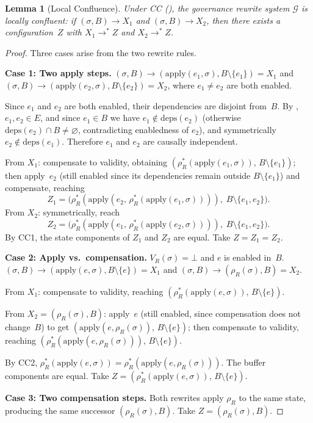 \documentclass[11pt,a4paper]{article}
\theoremstyle{plain}
\newtheorem{lemma}[theorem]{Lemma}
\theoremstyle{definition}
\theoremstyle{remark}
\renewcommand{\_}{\textunderscore\allowbreak}
\begin{document}
\begin{lemma}[Local Confluence]
\label{lem:local-confluence}
Under CC (), the governance rewrite system $\mathcal{G}$ is
locally confluent: if $(\sigma, B) \to X_1$ and $(\sigma, B) \to X_2$,
then there exists a configuration~$Z$ with $X_1 \to^* Z$ and
$X_2 \to^* Z$.
\end{lemma}
\begin{proof}
Three cases arise from the two rewrite rules.

\medskip\noindent\textbf{Case 1: Two apply steps.}\;
$(\sigma, B) \to (\mathrm{apply}(e_1, \sigma), B \setminus \{e_1\})
= X_1$ and
$(\sigma, B) \to (\mathrm{apply}(e_2, \sigma), B \setminus \{e_2\})
= X_2$, where $e_1 \neq e_2$ are both enabled.

Since $e_1$ and $e_2$ are both enabled, their dependencies are disjoint
from~$B$.  By , $e_1, e_2 \in E$, and since $e_1 \in B$ we
have $e_1 \notin \mathrm{deps}(e_2)$ (otherwise
$\mathrm{deps}(e_2) \cap B \neq \varnothing$, contradicting enabledness of
$e_2$), and symmetrically $e_2 \notin \mathrm{deps}(e_1)$.  Therefore $e_1$
and $e_2$ are causally independent.

From $X_1$: compensate to validity, obtaining
$(\rho_R^*(\mathrm{apply}(e_1, \sigma)),\, B \setminus \{e_1\})$; then
apply~$e_2$ (still enabled since its dependencies remain outside
$B \setminus \{e_1\}$) and compensate, reaching
\[
Z_1 = \bigl(\rho_R^*(\mathrm{apply}(e_2,\,
  \rho_R^*(\mathrm{apply}(e_1, \sigma)))),\;
  B \setminus \{e_1, e_2\}\bigr).
\]
From $X_2$: symmetrically, reach
\[
Z_2 = \bigl(\rho_R^*(\mathrm{apply}(e_1,\,
  \rho_R^*(\mathrm{apply}(e_2, \sigma)))),\;
  B \setminus \{e_1, e_2\}\bigr).
\]
By CC1, the state components of $Z_1$ and $Z_2$ are equal.  Take $Z = Z_1 = Z_2$.

\medskip\noindent\textbf{Case 2: Apply vs.\ compensation.}\;
$V_R(\sigma) = \bot$ and $e$ is enabled in~$B$.
$(\sigma, B) \to (\mathrm{apply}(e, \sigma), B \setminus \{e\}) = X_1$
and
$(\sigma, B) \to (\rho_R(\sigma), B) = X_2$.

From $X_1$: compensate to validity, reaching
$(\rho_R^*(\mathrm{apply}(e, \sigma)),\, B \setminus \{e\})$.

From $X_2 = (\rho_R(\sigma), B)$: apply~$e$ (still enabled, since
compensation does not change~$B$) to get
$(\mathrm{apply}(e, \rho_R(\sigma)),\, B \setminus \{e\})$; then
compensate to validity, reaching
$(\rho_R^*(\mathrm{apply}(e, \rho_R(\sigma))),\, B \setminus \{e\})$.

By CC2, $\rho_R^*(\mathrm{apply}(e, \sigma)) =
\rho_R^*(\mathrm{apply}(e, \rho_R(\sigma)))$.  The buffer components
are equal.  Take $Z = (\rho_R^*(\mathrm{apply}(e, \sigma)),\, B \setminus
\{e\})$.

\medskip\noindent\textbf{Case 3: Two compensation steps.}\;
Both rewrites apply $\rho_R$ to the same state, producing the same
successor $(\rho_R(\sigma), B)$.  Take $Z = (\rho_R(\sigma), B)$.
\end{proof}
\end{document}
